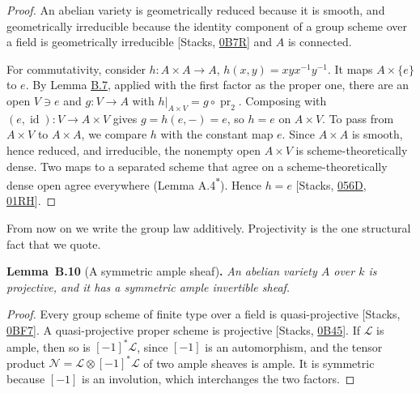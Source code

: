 \documentclass[11pt]{article}
\newenvironment{bpstatement}[2]{\par\addvspace{0.6\baselineskip}\noindent\textbf{#1}#2\textbf{.}\enspace\ignorespaces}
  {\par\addvspace{0.4\baselineskip}}
\newenvironment{bpstatementit}[2]{\begin{bpstatement}{#1}{#2}\itshape\ignorespaces}{\end{bpstatement}}
\newcommand{\bpout}[1]{#1\textsuperscript{\hyperlink{bp-outside}{\ensuremath{\ast}}}}
\begin{document}
\begin{proof}[{Proof}]\label{bp27}%
An abelian variety is geometrically reduced because it is smooth, and geometrically irreducible because the identity component of a group scheme over a field is geometrically irreducible [Stacks, \href{https://stacks.math.columbia.edu/tag/0B7R}{0B7R}] and \(A\) is connected.

For commutativity, consider \(h:A\times A\to A\), \(h(x,y)=xyx^{-1}y^{-1}\). It maps \(A\times\{e\}\) to \(e\). By Lemma \hyperref[bp20]{B.7}, applied with the first factor as the proper one, there are an open \(V\ni e\) and \(g:V\to A\) with \(h|_{A\times V}=g\circ\operatorname{pr}_2\). Composing with \((e,\operatorname{id}):V\to A\times V\) gives \(g=h(e,-)=e\), so \(h=e\) on \(A\times V\). To pass from \(A\times V\) to \(A\times A\), we compare \(h\) with the constant map \(e\). Since \(A\times A\) is smooth, hence reduced, and irreducible, the nonempty open \(A\times V\) is scheme-theoretically dense. Two maps to a separated scheme that agree on a scheme-theoretically dense open agree everywhere (Lemma \bpout{A.4}). Hence \(h=e\) [Stacks, \href{https://stacks.math.columbia.edu/tag/056D}{056D}, \href{https://stacks.math.columbia.edu/tag/01RH}{01RH}].
\end{proof}

\label{bp28}%
From now on we write the group law additively. Projectivity is the one structural fact that we quote.

\label{bp29}%
\begin{bpstatementit}{Lemma~B.10}{ (A symmetric ample sheaf)}
An abelian variety \(A\) over \(k\) is projective, and it has a symmetric ample invertible sheaf.
\end{bpstatementit}

\begin{proof}[{Proof}]\label{bp30}%
Every group scheme of finite type over a field is quasi-projective [Stacks, \href{https://stacks.math.columbia.edu/tag/0BF7}{0BF7}]. A quasi-projective proper scheme is projective [Stacks, \href{https://stacks.math.columbia.edu/tag/0B45}{0B45}]. If \(\mathcal L\) is ample, then so is \([-1]^*\mathcal L\), since \([-1]\) is an automorphism, and the tensor product \(\mathcal N=\mathcal L\otimes[-1]^*\mathcal L\) of two ample sheaves is ample. It is symmetric because \([-1]\) is an involution, which interchanges the two factors.
\end{proof}
\end{document}
